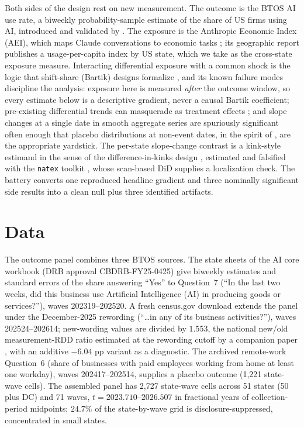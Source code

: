 \documentclass[11pt]{article}
\newcommand{\natex}{\texttt{natex}}
\begin{document}
Both sides of the design rest on new measurement. The outcome is the BTOS AI
use rate, a biweekly probability-sample estimate of the share of US firms
using AI, introduced and validated by \cite{bonney2024}. The exposure is the
Anthropic Economic Index (AEI), which maps Claude conversations to economic
tasks \cite{handa2025}; its geographic report \cite{appel2025} publishes a
usage-per-capita index by US state, which we take as the cross-state
exposure measure. Interacting differential exposure with a common shock is
the logic that shift-share (Bartik) designs formalize
\cite{goldsmithpinkham2020}, and its known failure modes discipline the
analysis: exposure here is measured \emph{after} the outcome window, so every
estimate below is a descriptive gradient, never a causal Bartik coefficient;
pre-existing differential trends can masquerade as treatment effects
\cite{roth2022}; and slope changes at a single date in smooth aggregate
series are spuriously significant often enough that placebo distributions at
non-event dates, in the spirit of \cite{ganong2018}, are the appropriate
yardstick. The per-state slope-change contrast is a kink-style estimand in
the sense of the difference-in-kinks design \cite{bockerman2025}, estimated
and falsified with the \natex{} toolkit \cite{natex}, whose scan-based DiD
\cite{herlands2018} supplies a localization check. The battery converts one
reproduced headline gradient and three nominally significant side results
into a clean null plus three identified artifacts.

\section{Data}\label{sec:data}

The outcome panel combines three BTOS sources. The state sheets of the AI
core workbook (DRB approval CBDRB-FY25-0425) give biweekly estimates and
standard errors of the share answering ``Yes'' to Question~7 (``In the last
two weeks, did this business use Artificial Intelligence (AI) in producing
goods or services?''), waves 202319--202520. A fresh census.gov download
extends the panel under the December-2025 rewording (``\ldots in any of its
business activities?''), waves 202524--202614; new-wording values are divided
by $1.553$, the national new/old measurement-RDD ratio estimated at the
rewording cutoff by a companion paper \cite{hillebrandt2026rewording}, with
an additive $-6.04$ pp variant as a diagnostic. The archived remote-work
Question~6 (share of businesses with paid employees working from home at
least one workday), waves 202417--202514, supplies a placebo outcome (1{,}221
state-wave cells). The assembled panel has 2{,}727 state-wave cells across 51
states (50 plus DC) and 71 waves, $t=2023.710$--$2026.507$ in fractional
years of collection-period midpoints; $24.7\%$ of the state-by-wave grid is
disclosure-suppressed, concentrated in small states.
\end{document}
